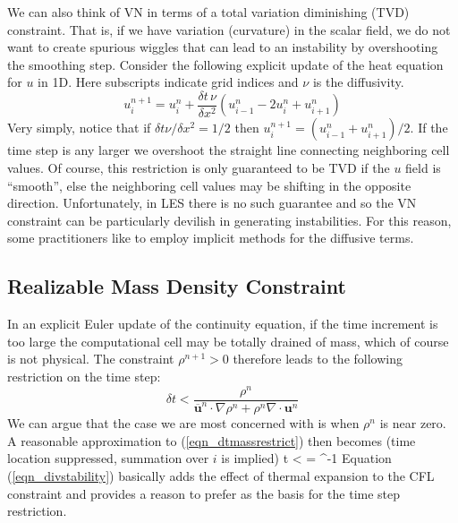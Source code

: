 We can also think of VN in terms of a total variation diminishing (TVD) constraint.  That is, if we have variation (curvature) in the scalar field, we do not want to create spurious wiggles that can lead to an instability by overshooting the smoothing step.  Consider the following explicit update of the heat equation for $u$ in 1D. Here subscripts indicate grid indices and $\nu$ is the diffusivity.
\begin{equation}
u_i^{n+1} = u_i^n + \frac{\delta t \, \nu}{\delta x^2} \left( u_{i-1}^n - 2u_i^n + u_{i+1}^n \right)
\end{equation}
Very simply, notice that if $\delta t \nu/\delta x^2 = 1/2$ then $u_i^{n+1} = (u_{i-1}^n + u_{i+1}^n)/2$.  If the time step is any larger we overshoot the straight line connecting neighboring cell values.  Of course, this restriction is only guaranteed to be TVD if the $u$ field is ``smooth'', else the neighboring cell values may be shifting in the opposite direction.  Unfortunately, in LES there is no such guarantee and so the VN constraint can be particularly devilish in generating instabilities. For this reason, some practitioners like to employ implicit methods for the diffusive terms.

\subsection{Realizable Mass Density Constraint}
\label{sec:mass_density_constraint}

In an explicit Euler update of the continuity equation, if the time increment is too large the computational cell may be totally drained of mass, which of course is not physical. The constraint $\rho^{n+1}>0$ therefore leads to the following restriction on the time step:
\begin{equation}
\label{eqn_dtmassrestrict}
\delta t < \frac{\rho^n}{\overline{\mathbf{u}}^n\cdot\nabla\rho^n + \rho^n \nabla\cdot\mathbf{u}^n}
\end{equation}
We can argue that the case we are most concerned with is when $\rho^n$ is near zero.  A reasonable approximation to (\ref{eqn_dtmassrestrict}) then becomes (time location suppressed, summation over $i$ is implied)
\be
\label{eqn_divstability}
\delta t <  = ^{-1}
\ee
Equation (\ref{eqn_divstability}) basically adds the effect of thermal expansion to the CFL constraint and provides a reason to prefer  as the basis for the time step restriction.

